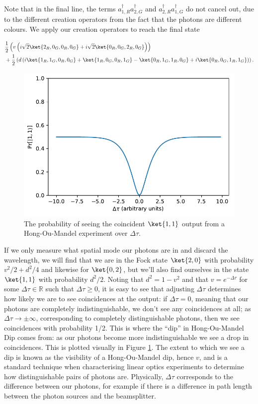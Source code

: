 Note that in the final line, the terms $a_{1,R}^\dagger a_{2,G}^\dagger$ and $a_{2,R}^\dagger a_{1,G}^\dagger$ do not cancel out, due to the different creation operators from the fact that the photons are different colours. We apply our creation operators to reach the final state

\begin{align}
&\frac{1}{2}\left(v\left(i\sqrt{2}\ket{2_R,0_G,0_R,0_G} +i\sqrt{2}\ket{0_R,0_G,2_R,0_G}\right)\right)\nonumber\\
&+\frac{1}{2}\left( d\left(i\ket{1_R,1_G,0_R,0_G} + \ket{1_R,0_G,0_R,1_G} - \ket{0_R,1_G,1_R,0_G}+i\ket{0_R,0_G,1_R,1_G} \right)\right).
\end{align}

\begin{figure}
\begin{center}
\includegraphics[width=0.5\linewidth]{preliminary_bs/hom_plot}
\end{center}
\caption{\label{fig:hom-plot}The probability of seeing the coincident $\ket{1,1}$ output from a Hong-Ou-Mandel experiment over $\Delta\tau$.}
\end{figure}

If we only measure what spatial mode our photons are in and discard the wavelength, we will find that we are in the Fock state $\ket{2,0}$ with probability $v^2/2 + d^2/4$ and likewise for $\ket{0,2}$, but we'll also find ourselves in the state $\ket{1,1}$ with probability $d^2/2$. Noting that $d^2 = 1-v^2$ and that $v=e^{-\Delta\tau}$ for some $\Delta\tau\in \mathbb{R}$ such that $\Delta\tau \geq 0$, it is easy to see that adjusting $\Delta\tau$ determines how likely we are to see coincidences at the output: if $\Delta\tau=0$, meaning that our photons are completely indistinguishable, we don't see any coincidences at all; as $\Delta\tau\rightarrow\pm\infty$, corresponding to completely distinguishable photons, then we see coincidences with probability 1/2. This is where the ``dip'' in Hong-Ou-Mandel Dip comes from: as our photons become more indistinguishable we see a drop in coincidences. This is plotted visually in Figure \ref{fig:hom-plot}. The extent to which we see a dip is known as the visibility of a Hong-Ou-Mandel dip, hence $v$, and is a standard technique when characterising linear optics experiments to determine how distinguishable pairs of photons are. Physically, $\Delta\tau$ corresponds to the difference between our photons, for example if there is a difference in path length between the photon sources and the beamsplitter.

